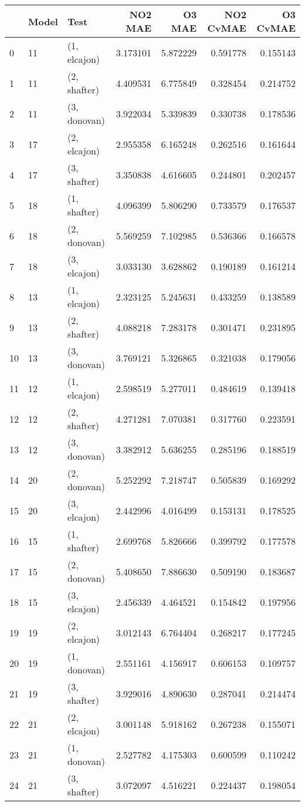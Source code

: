 \begin{tabular}{lllrrrr}
\toprule
{} & Model &          Test &   NO2 MAE &    O3 MAE &  NO2 CvMAE &  O3 CvMAE \\
\midrule
0  &    11 &  (1, elcajon) &  3.173101 &  5.872229 &   0.591778 &  0.155143 \\
1  &    11 &  (2, shafter) &  4.409531 &  6.775849 &   0.328454 &  0.214752 \\
2  &    11 &  (3, donovan) &  3.922034 &  5.339839 &   0.330738 &  0.178536 \\
3  &    17 &  (2, elcajon) &  2.955358 &  6.165248 &   0.262516 &  0.161644 \\
4  &    17 &  (3, shafter) &  3.350838 &  4.616605 &   0.244801 &  0.202457 \\
5  &    18 &  (1, shafter) &  4.096399 &  5.806290 &   0.733579 &  0.176537 \\
6  &    18 &  (2, donovan) &  5.569259 &  7.102985 &   0.536366 &  0.166578 \\
7  &    18 &  (3, elcajon) &  3.033130 &  3.628862 &   0.190189 &  0.161214 \\
8  &    13 &  (1, elcajon) &  2.323125 &  5.245631 &   0.433259 &  0.138589 \\
9  &    13 &  (2, shafter) &  4.088218 &  7.283178 &   0.301471 &  0.231895 \\
10 &    13 &  (3, donovan) &  3.769121 &  5.326865 &   0.321038 &  0.179056 \\
11 &    12 &  (1, elcajon) &  2.598519 &  5.277011 &   0.484619 &  0.139418 \\
12 &    12 &  (2, shafter) &  4.271281 &  7.070381 &   0.317760 &  0.223591 \\
13 &    12 &  (3, donovan) &  3.382912 &  5.636255 &   0.285196 &  0.188519 \\
14 &    20 &  (2, donovan) &  5.252292 &  7.218747 &   0.505839 &  0.169292 \\
15 &    20 &  (3, elcajon) &  2.442996 &  4.016499 &   0.153131 &  0.178525 \\
16 &    15 &  (1, shafter) &  2.699768 &  5.826666 &   0.399792 &  0.177578 \\
17 &    15 &  (2, donovan) &  5.408650 &  7.886630 &   0.509190 &  0.183687 \\
18 &    15 &  (3, elcajon) &  2.456339 &  4.464521 &   0.154842 &  0.197956 \\
19 &    19 &  (2, elcajon) &  3.012143 &  6.764404 &   0.268217 &  0.177245 \\
20 &    19 &  (1, donovan) &  2.551161 &  4.156917 &   0.606153 &  0.109757 \\
21 &    19 &  (3, shafter) &  3.929016 &  4.890630 &   0.287041 &  0.214474 \\
22 &    21 &  (2, elcajon) &  3.001148 &  5.918162 &   0.267238 &  0.155071 \\
23 &    21 &  (1, donovan) &  2.527782 &  4.175303 &   0.600599 &  0.110242 \\
24 &    21 &  (3, shafter) &  3.072097 &  4.516221 &   0.224437 &  0.198054 \\
\bottomrule
\end{tabular}
